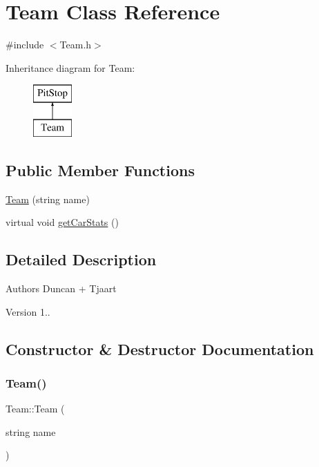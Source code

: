 \hypertarget{class_team}{}\section{Team Class Reference}
\label{class_team}


{\ttfamily \#include $<$Team.\+h$>$}

Inheritance diagram for Team\+:\begin{figure}[H]
\begin{center}
\leavevmode
\includegraphics[height=2.000000cm]{class_team}
\end{center}
\end{figure}
\subsection*{Public Member Functions}
\begin{DoxyCompactItemize}
\item 
\mbox{\hyperlink{class_team_af1b60969555b0df2aa2e3a0239738446}{Team}} (string name)
\item 
virtual void \mbox{\hyperlink{class_team_ac06b2e2837cace2a8aa9b579dcd69a52}{get\+Car\+Stats}} ()
\end{DoxyCompactItemize}


\subsection{Detailed Description}
\begin{DoxyAuthor}{Authors}
Duncan + Tjaart 
\end{DoxyAuthor}
\begin{DoxyVersion}{Version}
1.. 
\end{DoxyVersion}


\subsection{Constructor \& Destructor Documentation}
\mbox{\label{class_team_af1b60969555b0df2aa2e3a0239738446}} 
\subsubsection{\texorpdfstring{Team()}{Team()}}
{\footnotesize\ttfamily Team\+::\+Team (\begin{DoxyParamCaption}\item[{string}]{name }\end{DoxyParamCaption})}

